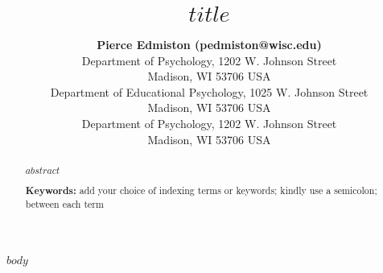\documentclass[10pt,letterpaper]{article}
\title{$title$}
\author{{\large \bf Pierce Edmiston (pedmiston@wisc.edu)} \\
  Department of Psychology, 1202 W. Johnson Street \\
  Madison, WI 53706 USA
  \AND {\large \bf Marcus Perlman} \\
  Department of Educational Psychology, 1025 W. Johnson Street \\
  Madison, WI 53706 USA
  \AND {\large \bf Gary Lupyan} \\
  Department of Psychology, 1202 W. Johnson Street \\
  Madison, WI 53706 USA}
\begin{document}
\maketitle

\begin{abstract}
$abstract$

\textbf{Keywords:}
add your choice of indexing terms or keywords; kindly use a
semicolon; between each term
\end{abstract}

$body$



\end{document}

